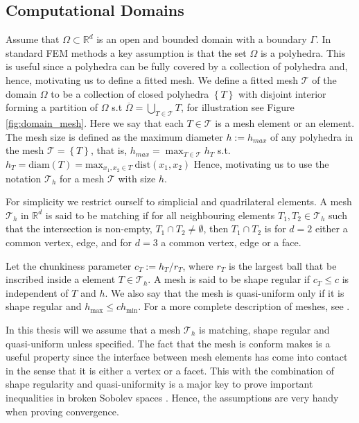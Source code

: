 \subsection{Computational Domains}%
\label{sub:computational_domain}
Assume that $\Omega \subset \mathbb{R} ^{d} $ is an open and bounded domain with a boundary $\Gamma $. In standard FEM methods a key assumption is that the set $\Omega $ is a polyhedra. This is useful since a polyhedra can be fully covered by a collection of polyhedra and, hence, motivating us to define a fitted mesh.
We define a fitted mesh $\mathcal{T} $ of the domain $\Omega $ to be a collection of closed polyhedra $\left\{ T \right\}  $ with disjoint interior forming a partition of $\Omega $ s.t $\overline{\Omega } = \bigcup _{T \in \mathcal{T} } T $, for illustration see Figure
\ref{fig:domain_mesh}.
Here we say that each $T \in  \mathcal{T} $ is a mesh element or an element.
The mesh size is defined as the maximum diameter $h := h_{max} $ of any polyhedra in the mesh $\mathcal{T} = \left\{ T \right\}  $, that is, $ h_{max} = \max_{T \in \mathcal{T} }  h_{T}$ s.t.
$h _{T}  = \mathrm{diam}\left( T \right)   = \mathrm{max}_{x_1, x_{2} \in T} \ \mathrm{ dist }(x_{1}, x_{2})$
Hence, motivating us to use the notation $\mathcal{T} _{h}$ for a mesh $\mathcal{T} $ with size $h$.

For simplicity we restrict ourself to simplicial and quadrilateral elements.
A mesh $\mathcal{T}_{h}$ in $ \mathbb{R} ^{d}$ is said to be matching if
for all neighbouring elements $T_{1}, T_{2} \in \mathcal{T} _{h}$ such that the intersection is non-empty, $T_{1} \cap T_{2} \neq \emptyset  $, then $T_{1}\cap T_{2}$ is for $d=2$ either a common vertex, edge, and for $d=3$ a common vertex, edge or a face.

Let the chunkiness parameter $c_{T} := h_{T}/r_{T}$, where $r_{T}$  is the largest ball that be inscribed inside a element $T \in \mathcal{T}_{h} $.
A mesh is said to be shape regular if $c_{T}\le  c$ is independent of $T$  and $h$. We also say that the mesh is quasi-uniform only if it is shape regular and $h_{\mathrm{ max }} \le  c h_{\mathrm{ min }}$.
For a more complete description of meshes, see \cite[Chapter 8]{ErnGuermond2021}.

In this thesis will we assume that a mesh $\mathcal{T}_{h} $ is matching, shape regular and quasi-uniform unless specified.
 The fact that the mesh is conform makes is a useful property since the interface between mesh elements has come into contact in the sense
that it is either a vertex or a facet. This with the combination of shape regularity and quasi-uniformity is a major key to prove important inequalities in broken Sobolev spaces \cite[Chapter 1.4.1]{pietro2012}. Hence, the assumptions are very handy when proving convergence.


